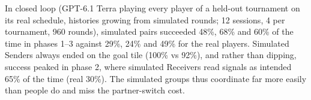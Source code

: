 In closed loop (GPT-6.1 Terra playing every player of a held-out tournament on its real schedule, histories growing from simulated rounds; 12 sessions, 4 per tournament, 960 rounds), simulated pairs succeeded 48\%, 68\% and 60\% of the time in phases 1--3 against 29\%, 24\% and 49\% for the real players. Simulated Senders always ended on the goal tile (100\% vs 92\%), and rather than dipping, success peaked in phase 2, where simulated Receivers read signals as intended 65\% of the time (real 30\%). The simulated groups thus coordinate far more easily than people do and miss the partner-switch cost.
